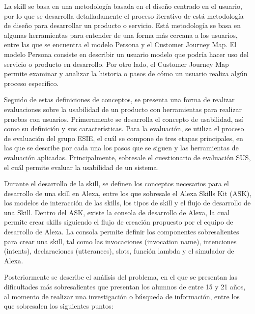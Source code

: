 La skill se basa en una metodología basada en el diseño centrado en el usuario, por lo que se desarrolla detalladamente el proceso iterativo de está metodología de diseño para desarrollar un producto o servicio. Está metodología se basa en algunas herramientas para entender de una forma más cercana a los usuarios, entre las que se encuentra el modelo Persona y el Customer Journey Map. El modelo Persona consiste en describir un usuario modelo que podría hacer uso del servicio o producto en desarrollo. Por otro lado, el Customer Journey Map permite examinar y analizar la historia o pasos de cómo un usuario realiza algún proceso específico.

Seguido de estas definiciones de conceptos, se presenta una forma de realizar evaluaciones sobre la usabilidad de un producto con herramientas para realizar pruebas con usuarios. Primeramente se desarrolla el concepto de usabilidad, así como su definición y sus características. Para la evaluación, se utiliza el proceso de evaluación del grupo ESIE, el cuál se compone de tres etapas principales, en las que se describe por cada una los pasos que se siguen y las herramientas de evaluación aplicadas. Principalmente, sobresale el cuestionario de evaluación SUS, el cuál permite evaluar la usabilidad de un sistema.

Durante el desarrollo de la skill, se definen los conceptos necesarios para el desarrollo de una skill en Alexa, entre los que sobresale el Alexa Skills Kit (ASK), los modelos de interacción de las skills, los tipos de skill y el flujo de desarrollo de una Skill. Dentro del ASK, existe la consola de desarrollo de Alexa, la cual permite crear skills siguiendo el flujo de creación propuesto por el equipo de desarrollo de Alexa. La consola permite definir los componentes sobresalientes para crear una skill, tal como las invocaciones (invocation name), intenciones (intents), declaraciones (utterances), slots, función lambda y el simulador de Alexa.

Posteriormente se describe el análisis del problema, en el que se presentan las dificultades más sobresalientes que presentan los alumnos de entre 15 y 21 años, al momento de realizar una investigación o búsqueda de información, entre los que sobresalen los siguientes puntos:

